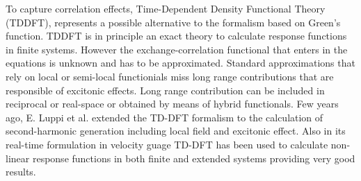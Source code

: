 To capture correlation effects, Time-Dependent Density Functional Theory (TDDFT)\cite{PhysRevLett.52.997}, represents a possible alternative to the formalism based on Green's function. TDDFT is in principle an exact theory to calculate response functions in finite systems. However the exchange-correlation functional that enters in the equations is unknown and has to be approximated. Standard approximations that rely on local or semi-local functionials miss long range contributions that are responsible of excitonic effects\cite{botti2007time}. Long range contribution can be included in reciprocal or real-space or obtained by means of hybrid functionals.\cite{botti2007time} Few years ago, E. Luppi et al. extended the TD-DFT formalism to the calculation of second-harmonic generation including local field and excitonic effect.\cite{PhysRevB.82.235201} 
Also in its real-time formulation in velocity guage TD-DFT has been used to calculate non-linear response functions in both finite and extended systems providing very good results.\cite{takimoto:154114,andrade2007time} 
